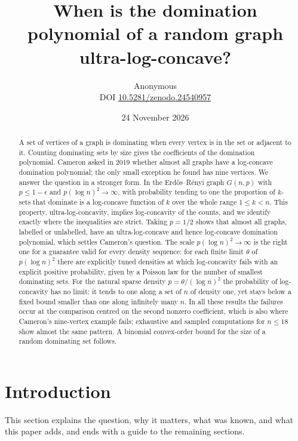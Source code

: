 \documentclass[11pt]{article}
\title{When is the domination polynomial of a random graph\protect\\ ultra-log-concave?}
\author{Anonymous\\[3pt]{\small DOI \href{https://doi.org/10.5281/zenodo.24540957}{10.5281/zenodo.24540957}}}
\date{24 November 2026}
\theoremstyle{remark}
\begin{document}
\maketitle
\begin{abstract}
A set of vertices of a graph is dominating when every vertex is in the set or adjacent to it. Counting dominating sets by size gives the coefficients of the domination polynomial. Cameron asked in 2019 whether almost all graphs have a log-concave domination polynomial; the only small exception he found has nine vertices. We answer the question in a stronger form. In the Erd\H{o}s--R\'enyi graph $G(n,p)$ with $p\le 1-\epsilon$ and $p(\log n)^2\to\infty$, with probability tending to one the proportion of $k$-sets that dominate is a log-concave function of $k$ over the whole range $1\le k<n$. This property, ultra-log-concavity, implies log-concavity of the counts, and we identify exactly where the inequalities are strict. Taking $p=1/2$ shows that almost all graphs, labelled or unlabelled, have an ultra-log-concave and hence log-concave domination polynomial, which settles Cameron's question. The scale $p(\log n)^2\to\infty$ is the right one for a guarantee valid for every density sequence: for each finite limit $\theta$ of $p(\log n)^2$ there are explicitly tuned densities at which log-concavity fails with an explicit positive probability, given by a Poisson law for the number of smallest dominating sets. For the natural sparse density $p=\theta/(\log n)^2$ the probability of log-concavity has no limit: it tends to one along a set of $n$ of density one, yet stays below a fixed bound smaller than one along infinitely many $n$. In all these results the failures occur at the comparison centred on the second nonzero coefficient, which is also where Cameron's nine-vertex example fails; exhaustive and sampled computations for $n\le 18$ show almost the same pattern. A binomial convex-order bound for the size of a random dominating set follows.
\end{abstract}

\section{Introduction}
This section explains the question, why it matters, what was known, and what this paper adds, and ends with a guide to the remaining sections.
\end{document}
